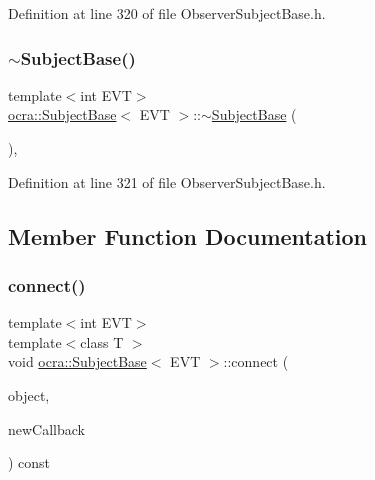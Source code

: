Definition at line 320 of file Observer\+Subject\+Base.\+h.

\hypertarget{classocra_1_1SubjectBase_aafd9cdf387f71e552097273d0699ec0b}{}\label{classocra_1_1SubjectBase_aafd9cdf387f71e552097273d0699ec0b} 
\subsubsection{\texorpdfstring{$\sim$\+Subject\+Base()}{~SubjectBase()}}
{\footnotesize\ttfamily template$<$int E\+VT$>$ \\
\hyperlink{classocra_1_1SubjectBase}{ocra\+::\+Subject\+Base}$<$ E\+VT $>$\+::$\sim$\hyperlink{classocra_1_1SubjectBase}{Subject\+Base} (\begin{DoxyParamCaption}{ }\end{DoxyParamCaption})\hspace{0.3cm}{\ttfamily [inline]}, {\ttfamily [protected]}}



Definition at line 321 of file Observer\+Subject\+Base.\+h.



\subsection{Member Function Documentation}
\hypertarget{classocra_1_1SubjectBase_a3f0e6104fbce76bb404baf26f492abe1}{}\label{classocra_1_1SubjectBase_a3f0e6104fbce76bb404baf26f492abe1} 
\subsubsection{\texorpdfstring{connect()}{connect()}\hspace{0.1cm}{\footnotesize\ttfamily [1/2]}}
{\footnotesize\ttfamily template$<$int E\+VT$>$ \\
template$<$class T $>$ \\
void \hyperlink{classocra_1_1SubjectBase}{ocra\+::\+Subject\+Base}$<$ E\+VT $>$\+::connect (\begin{DoxyParamCaption}\item[{T \&}]{object,  }\item[{typename \hyperlink{structocra_1_1SubjectBaseTraits}{Subject\+Base\+Traits}$<$ E\+VT, T $>$\+::callback\+\_\+type}]{new\+Callback }\end{DoxyParamCaption}) const\hspace{0.3cm}{\ttfamily [inline]}}



